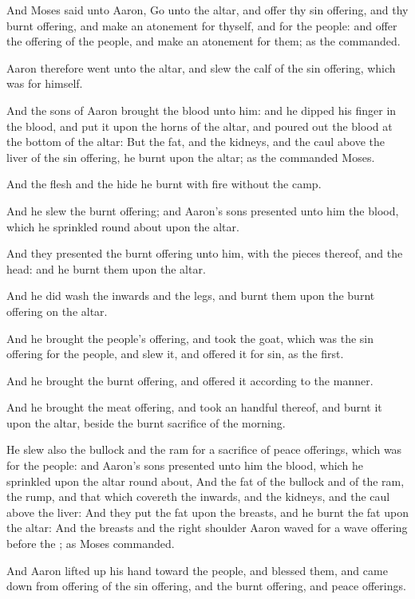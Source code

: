 \verse And Moses said unto Aaron, Go unto the altar, and offer thy sin offering, and thy burnt offering, and make an atonement for thyself, and for the people: and offer the offering of the people, and make an atonement for them; as the \LORD commanded.

\verse Aaron therefore went unto the altar, and slew the calf of the sin offering, which was for himself.

\verse And the sons of Aaron brought the blood unto him: and he dipped his finger in the blood, and put it upon the horns of the altar, and poured out the blood at the bottom of the altar: \verse But the fat, and the kidneys, and the caul above the liver of the sin offering, he burnt upon the altar; as the \LORD commanded Moses.

\verse And the flesh and the hide he burnt with fire without the camp.

\verse And he slew the burnt offering; and Aaron's sons presented unto him the blood, which he sprinkled round about upon the altar.

\verse And they presented the burnt offering unto him, with the pieces thereof, and the head: and he burnt them upon the altar.

\verse And he did wash the inwards and the legs, and burnt them upon the burnt offering on the altar.

\verse And he brought the people's offering, and took the goat, which was the sin offering for the people, and slew it, and offered it for sin, as the first.

\verse And he brought the burnt offering, and offered it according to the manner.

\verse And he brought the meat offering, and took an handful thereof, and burnt it upon the altar, beside the burnt sacrifice of the morning.

\verse He slew also the bullock and the ram for a sacrifice of peace offerings, which was for the people: and Aaron's sons presented unto him the blood, which he sprinkled upon the altar round about, \verse And the fat of the bullock and of the ram, the rump, and that which covereth the inwards, and the kidneys, and the caul above the liver: \verse And they put the fat upon the breasts, and he burnt the fat upon the altar: \verse And the breasts and the right shoulder Aaron waved for a wave offering before the \LORD; as Moses commanded.

\verse And Aaron lifted up his hand toward the people, and blessed them, and came down from offering of the sin offering, and the burnt offering, and peace offerings.


